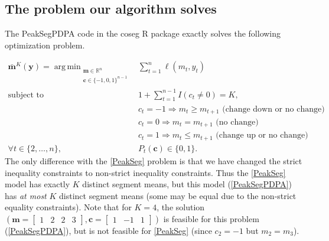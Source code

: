 \documentclass{article}
\DeclareMathOperator*{\argmin}{arg\,min}
\newcommand{\RR}{\mathbb R}
\begin{document}
\subsection{The problem our algorithm solves}

The PeakSegPDPA code in the coseg R package exactly solves the
following optimization problem.

\begin{align}
  \mathbf{\bar m}^K(\mathbf y) =
    \argmin_{\substack{
  \mathbf m\in\RR^{n}
\\
  \mathbf c\in\{-1,0,1\}^{n-1}
  }} &\ \ 
    \sum_{t=1}^n \ell( m_t,  y_t) 
  \label{PeakSegPDPA}
\\
    \text{subject to} &\ \  1+ \sum_{t=1}^{n-1} I(c_t \neq 0) = K, 
\nonumber\\
& \ \ c_t = -1 \Rightarrow m_{t} \geq m_{t+1} \text{ (change down or no change)}
\nonumber\\
& \ \ c_t = 0 \Rightarrow m_{t} = m_{t+1}  \text{ (no change)}
\nonumber\\
& \ \ c_t = 1 \Rightarrow m_{t} \leq m_{t+1} \text{ (change up or no change)}
\nonumber\\
\forall t\in\{2, \dots, n\}, &\ \ P_t(\mathbf c) \in\{0, 1\}.
\nonumber
\end{align}
The only difference with the \ref{PeakSeg} problem is that we have
changed the strict inequality constraints to non-strict inequality
constraints. Thus the \ref{PeakSeg} model has exactly $K$ distinct
segment means, but this model (\ref{PeakSegPDPA}) has \emph{at most}
$K$ distinct segment means (some may be equal due to the non-strict
equality constraints). Note that for $K=4$, the solution
$(\mathbf m = \left[\begin{array}{cccc}1 & 2 & 2 & 3 \end{array}\right],
  \mathbf c = \left[\begin{array}{ccc}  1 & -1 & 1 \end{array}\right])$
is feasible for this problem (\ref{PeakSegPDPA}), 
but is not feasible for \ref{PeakSeg} (since $c_2=-1$ but $m_2 = m_3$).
\end{document}
